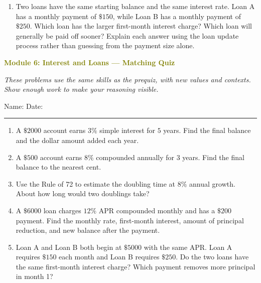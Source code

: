 \documentclass[11pt]{article}
\newcommand{\quizhead}[2]{%
  \clearpage
  {\Large\bfseries\textcolor{olive}{Module #1: #2 — Matching Quiz}}\par
  \textit{These problems use the same skills as the prequiz, with new values and contexts. Show enough work to make your reasoning visible.}\par
  Name: \hspace{2.6in} Date: \hspace{1.1in}\par
  \vspace{2pt}\textcolor{gold}{\rule{\linewidth}{1.2pt}}\par\smallskip
}
\newcommand{\workmed}{\par\vspace{0.62in}}
\newcommand{\worklarge}{\par\vspace{0.92in}}
\begin{document}
\begin{enumerate}
\item Two loans have the same starting balance and the same interest rate. Loan A has a monthly payment of \(\$150\), while Loan B has a monthly payment of \(\$250\). Which loan has the larger first-month interest charge? Which loan will generally be paid off sooner? Explain each answer using the loan update process rather than guessing from the payment size alone.
\worklarge
\end{enumerate}

\quizhead{6}{Interest and Loans}
\begin{enumerate}
\item A \(\$2000\) account earns \(3\%\) simple interest for \(5\) years. Find the final balance and the dollar amount added each year.
\workmed

\item A \(\$500\) account earns \(8\%\) compounded annually for \(3\) years. Find the final balance to the nearest cent.
\workmed

\item Use the Rule of 72 to estimate the doubling time at \(8\%\) annual growth. About how long would two doublings take?
\workmed

\item A \(\$6000\) loan charges \(12\%\) APR compounded monthly and has a \(\$200\) payment. Find the monthly rate, first-month interest, amount of principal reduction, and new balance after the payment.
\worklarge

\item Loan A and Loan B both begin at \(\$5000\) with the same APR. Loan A requires \(\$150\) each month and Loan B requires \(\$250\). Do the two loans have the same first-month interest charge? Which payment removes more principal in month 1?
\workmed
\end{enumerate}
\end{document}
